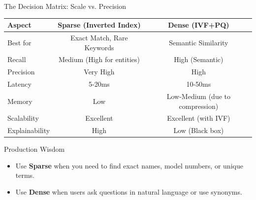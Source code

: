 \documentclass[aspectratio=169]{beamer}
\newif\ifanimated
\newcommand{\cpause}{\ifanimated\pause\fi}
\begin{document}
\begin{frame}{The Decision Matrix: Scale vs. Precision}
\begin{table}
\centering
\small
\begin{tabular}{lcc}
\toprule
\textbf{Aspect} & \textbf{Sparse (Inverted Index)} & \textbf{Dense (IVF+PQ)} \\
\midrule
Best for & Exact Match, Rare Keywords & Semantic Similarity \\
Recall & Medium (High for entities) & High (Semantic) \\
Precision & Very High & High \\
Latency & 5-20ms & 10-50ms \\
Memory & Low & Low-Medium (due to compression) \\
Scalability & Excellent & Excellent (with IVF) \\
Explainability & High & Low (Black box) \\
\bottomrule
\end{tabular}
\end{table}

\vspace{1em}

\begin{block}{Production Wisdom}
\begin{itemize}
    \item Use \textbf{Sparse} when you need to find exact names, model numbers, or unique terms.
    \item Use \textbf{Dense} when users ask questions in natural language or use synonyms.
\end{itemize}
\end{block}
\cpause
\end{frame}

\end{document}
